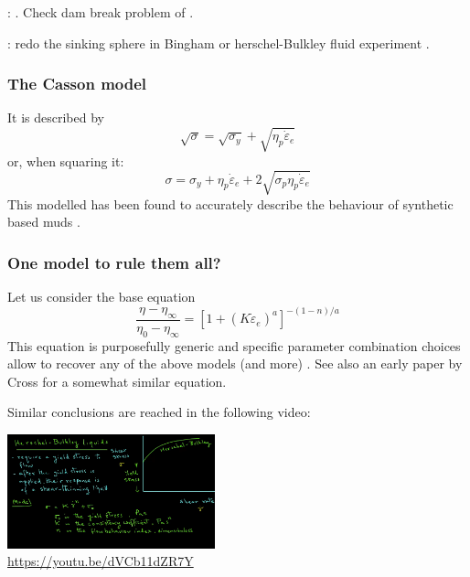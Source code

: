 
\Literature: \cite{madd13,mazf}. Check dam break problem of \cite{anco09,coan09,bafp09,tagm09,miga09}.


\mscthesis{}: redo the sinking sphere in Bingham or herschel-Bulkley fluid experiment \cite{demj04}. 

\subsubsection{The Casson model}

It is described by \cite{barn99} 
\[
\sqrt{\sigma} = \sqrt{\sigma_y} + \sqrt{\eta_p \dot{\varepsilon}_e} 
\]
or, when squaring it:
\[
\sigma = \sigma_y + \eta_p \dot{\varepsilon}_e + 2\sqrt{\sigma_p \eta_p \dot{\varepsilon}_e} 
\]
This modelled has been found to accurately describe the behaviour of synthetic based muds \cite{adlo17}. 

\subsubsection{One model to rule them all?}

Let us consider the base equation
\[
\frac{\eta-\eta_\infty}{\eta_0-\eta_\infty} = 
\left[ 1+(K \dot{\varepsilon}_e)^a  \right]^{-(1-n)/a}
\]
This equation is purposefully generic and specific parameter combination choices 
allow to recover any of the above models (and more) \cite{osru14}.
See also an early paper by Cross \cite{cros65} for a somewhat similar equation. 

Similar conclusions are reached in the following video:
\begin{center}
\includegraphics[width=6cm]{images/rheology/hbyoutube}\\
{\captionfont \url{https://youtu.be/dVCb11dZR7Y}}
\end{center}



